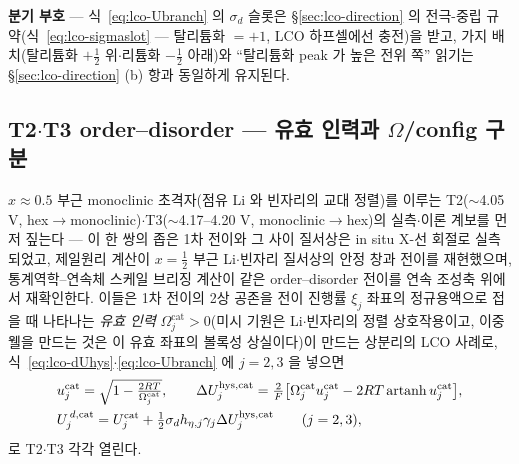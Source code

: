 \textbf{분기 부호} --- 식~\eqref{eq:lco-Ubranch} 의 $\sigma_d$ 슬롯은 \S\ref{sec:lco-direction} 의 전극-중립
규약(식~\eqref{eq:lco-sigmaslot} --- 탈리튬화 $=+1$, LCO 하프셀에선 충전)을 받고, 가지 배치(탈리튬화
$+\tfrac12$ 위$\cdot$리튬화 $-\tfrac12$ 아래)와 ``탈리튬화 peak 가 높은 전위 쪽'' 읽기는 \S\ref{sec:lco-direction} (b)
항과 동일하게 유지된다.

\subsection{T2$\cdot$T3 order--disorder --- 유효 인력과 $\Omega$/config 구분}\label{sec:lco-hys-od}
$x\approx0.5$ 부근 monoclinic 초격자(점유 Li 와 빈자리의 교대 정렬)를 이루는 T2($\sim$4.05 V,
hex$\to$monoclinic)$\cdot$T3($\sim$4.17--4.20 V, monoclinic$\to$hex)의 실측$\cdot$이론 계보를 먼저
짚는다 --- 이 한 쌍의 좁은 1차 전이와 그 사이 질서상은 in situ X-선 회절로 실측되었고\cite{reimers1992},
제일원리 계산이 $x{=}\tfrac12$ 부근 Li$\cdot$빈자리 질서상의 안정 창과 전이를 재현했으며\cite{vanderven1998},
통계역학–연속체 스케일 브리징 계산이 같은 order--disorder 전이를 연속 조성축 위에서
재확인한다\cite{ml2024}. 이들은 1차 전이의 2상 공존을 전이
진행률 $\xi_j$ 좌표의 정규용액으로 접을 때 나타나는 \emph{유효 인력} $\Omega_j^\mathrm{cat}>0$(미시
기원은 Li$\cdot$빈자리의 정렬 상호작용이고, 이중웰을 만드는 것은 이 유효 좌표의 볼록성 상실이다)이
만드는 상분리의 LCO 사례로, 식~\eqref{eq:lco-dUhys}$\cdot$\eqref{eq:lco-Ubranch} 에 $j=2,3$ 을 넣으면
\[
\begin{aligned}
&u_j^\mathrm{cat}=\sqrt{1-\tfrac{2RT}{\Omega_j^\mathrm{cat}}},\qquad
\Delta U_j^{\mathrm{hys},\mathrm{cat}}=\tfrac{2}{F}\big[\Omega_j^\mathrm{cat}u_j^\mathrm{cat}
-2RT\,\mathrm{artanh}\,u_j^\mathrm{cat}\big],\\
&U_j^{\,d,\mathrm{cat}}=U_j^\mathrm{cat}+\tfrac12\sigma_d h_{\eta,j}\gamma_j\Delta U_j^{\mathrm{hys},\mathrm{cat}}
\qquad(j=2,3),
\end{aligned}
\]
로 T2$\cdot$T3 각각 열린다.

